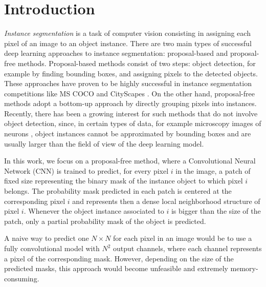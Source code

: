 
\section{Introduction}\label{sec:intro}

\emph{Instance segmentation} is a task of computer vision consisting in assigning each pixel of an image to an object instance. %
There are two main types of successful deep learning approaches to instance segmentation: proposal-based and proposal-free methods. 
Proposal-based methods consist of two steps: object detection, for example by finding bounding boxes, and assigning pixels to the detected objects. These approaches have proven to be highly successful in instance segmentation competitions like MS COCO \cite{lin2014microsoft} and CityScapes \cite{cordts2016cityscapes}. 
On the other hand, proposal-free methods adopt a bottom-up approach by directly grouping pixels into instances. Recently, there has been a growing interest for such methods that do not involve object detection, since, in certain types of data, for example microscopy images of neurons \cite{arganda2015crowdsourcing}, object instances cannot be approximated by bounding boxes and are usually larger than the field of view of the deep learning model. 

In this work, we focus on a proposal-free method, where a Convolutional Neural Network (CNN) is trained to predict, for every pixel $i$ in the image, a patch of fixed size representing the binary mask of the instance object to which pixel $i$ belongs. The probability mask predicted in each patch is centered at the corresponding pixel $i$ and represents then a dense local neighborhood structure of pixel $i$. Whenever the object instance associated to $i$ is bigger than the size of the patch, only a partial probability mask of the object is predicted. 

A naive way to predict one $N\times N$ \patch  for each pixel in an image would be to use a fully convolutional model with $N^2$ output channels, where each channel represents a pixel of the corresponding mask. However, depending on the size of the predicted masks, this approach would become unfeasible and extremely memory-consuming.

